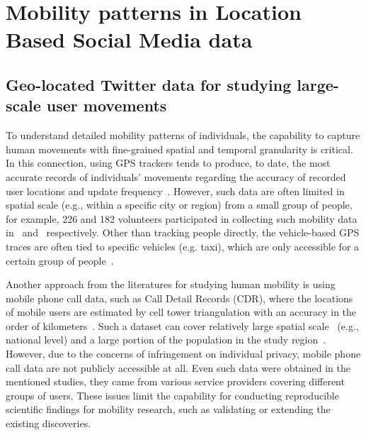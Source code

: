 \documentclass[ijgi,article,submit,moreauthors,pdftex,10pt,a4paper]{mdpi}
\theoremstyle{mdpi}
\newcounter{ex}
\newcounter{re}
\theoremstyle{mdpidefinition}
\begin{document}
\section{Mobility patterns in Location Based Social Media data}
\subsection{Geo-located Twitter data for studying large-scale user movements}
To understand detailed mobility patterns of individuals, the capability to capture human movements with fine-grained spatial and temporal granularity is critical.
In this connection, using GPS trackers tends to produce, to date, the most accurate records of individuals' movements regarding the accuracy of recorded user locations and update frequency~\cite{zheng2008understanding}.
However, such data are often limited in spatial scale (e.g., within a specific city or region) from a small group of people, for example, 226 and 182 volunteers participated in collecting such mobility data in~\cite{rhee2011levy} and~\cite{zheng2010geolife} respectively.
Other than tracking people directly, the vehicle-based GPS traces are often tied to specific vehicles (e.g. taxi), which are only accessible for a certain group of people~\cite{kung2014exploring}. 

Another approach from the literatures for studying human mobility is using mobile phone call data, such as Call Detail Records (CDR), where the locations of mobile users are estimated by cell tower triangulation with an accuracy in the order of kilometers~\cite{gonzalez2008understanding,sevtsuk2010does,kung2014exploring}.
Such a dataset can cover relatively large spatial scale~\cite{becker2013human,sobolevsky2013delineating} (e.g., national level) and a large portion of the population in the study region~\cite{kung2014exploring}.
However, due to the concerns of infringement on individual privacy, mobile phone call data are not publicly accessible at all.
Even such data were obtained in the mentioned studies, they came from various service providers covering different groups of users.
These issues limit the capability for conducting reproducible scientific findings for mobility research, such as validating or extending the existing discoveries.
\end{document}
